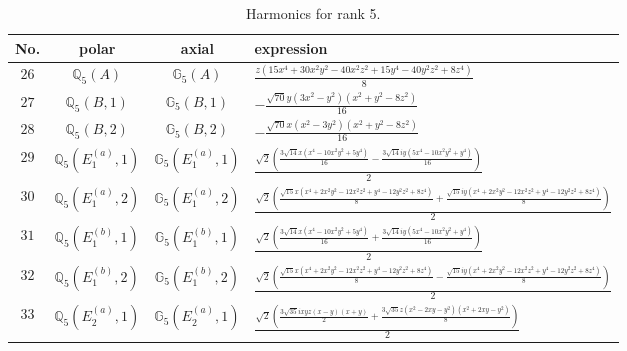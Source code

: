 \documentclass[fleqn,8pt,landscape]{jsarticle}
\begin{document}
\begin{table}[ht!]
\begin{center}
\caption{Harmonics for rank 5.}
\renewcommand{\arraystretch}{1.3}
\begin{tabular}{cccl} \hline \hline
No. & polar & axial & expression \\ \hline
$ 26 $ & $ \mathbb{Q}_{5}(A) $ & $ \mathbb{G}_{5}(A) $ & $ \frac{z \left(15 x^{4} + 30 x^{2} y^{2} - 40 x^{2} z^{2} + 15 y^{4} - 40 y^{2} z^{2} + 8 z^{4}\right)}{8} $ \\
$ 27 $ & $ \mathbb{Q}_{5}(B,1) $ & $ \mathbb{G}_{5}(B,1) $ & $ - \frac{\sqrt{70} y \left(3 x^{2} - y^{2}\right) \left(x^{2} + y^{2} - 8 z^{2}\right)}{16} $ \\
$ 28 $ & $ \mathbb{Q}_{5}(B,2) $ & $ \mathbb{G}_{5}(B,2) $ & $ - \frac{\sqrt{70} x \left(x^{2} - 3 y^{2}\right) \left(x^{2} + y^{2} - 8 z^{2}\right)}{16} $ \\
$ 29 $ & $ \mathbb{Q}_{5}(E_{1}^{(a)},1) $ & $ \mathbb{G}_{5}(E_{1}^{(a)},1) $ & $ \frac{\sqrt{2} \left(\frac{3 \sqrt{14} x \left(x^{4} - 10 x^{2} y^{2} + 5 y^{4}\right)}{16} - \frac{3 \sqrt{14} i y \left(5 x^{4} - 10 x^{2} y^{2} + y^{4}\right)}{16}\right)}{2} $ \\
$ 30 $ & $ \mathbb{Q}_{5}(E_{1}^{(a)},2) $ & $ \mathbb{G}_{5}(E_{1}^{(a)},2) $ & $ \frac{\sqrt{2} \left(\frac{\sqrt{15} x \left(x^{4} + 2 x^{2} y^{2} - 12 x^{2} z^{2} + y^{4} - 12 y^{2} z^{2} + 8 z^{4}\right)}{8} + \frac{\sqrt{15} i y \left(x^{4} + 2 x^{2} y^{2} - 12 x^{2} z^{2} + y^{4} - 12 y^{2} z^{2} + 8 z^{4}\right)}{8}\right)}{2} $ \\
$ 31 $ & $ \mathbb{Q}_{5}(E_{1}^{(b)},1) $ & $ \mathbb{G}_{5}(E_{1}^{(b)},1) $ & $ \frac{\sqrt{2} \left(\frac{3 \sqrt{14} x \left(x^{4} - 10 x^{2} y^{2} + 5 y^{4}\right)}{16} + \frac{3 \sqrt{14} i y \left(5 x^{4} - 10 x^{2} y^{2} + y^{4}\right)}{16}\right)}{2} $ \\
$ 32 $ & $ \mathbb{Q}_{5}(E_{1}^{(b)},2) $ & $ \mathbb{G}_{5}(E_{1}^{(b)},2) $ & $ \frac{\sqrt{2} \left(\frac{\sqrt{15} x \left(x^{4} + 2 x^{2} y^{2} - 12 x^{2} z^{2} + y^{4} - 12 y^{2} z^{2} + 8 z^{4}\right)}{8} - \frac{\sqrt{15} i y \left(x^{4} + 2 x^{2} y^{2} - 12 x^{2} z^{2} + y^{4} - 12 y^{2} z^{2} + 8 z^{4}\right)}{8}\right)}{2} $ \\
$ 33 $ & $ \mathbb{Q}_{5}(E_{2}^{(a)},1) $ & $ \mathbb{G}_{5}(E_{2}^{(a)},1) $ & $ \frac{\sqrt{2} \left(\frac{3 \sqrt{35} i x y z \left(x - y\right) \left(x + y\right)}{2} + \frac{3 \sqrt{35} z \left(x^{2} - 2 x y - y^{2}\right) \left(x^{2} + 2 x y - y^{2}\right)}{8}\right)}{2} $ \\

\end{tabular}
\end{center}
\end{table}
\end{document}
